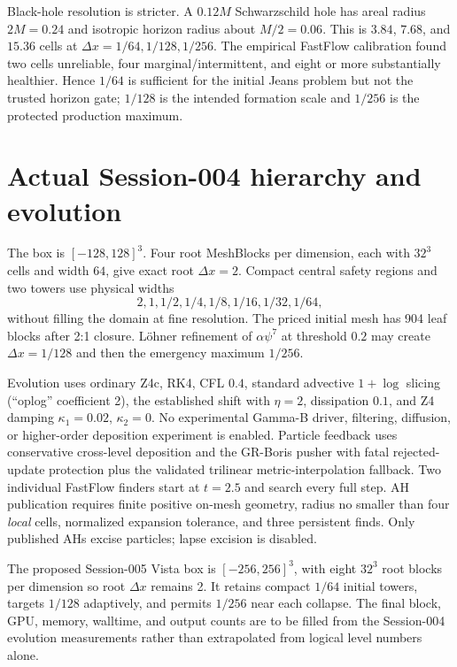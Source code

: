 \documentclass[11pt]{article}
\begin{document}
Black-hole resolution is stricter.  A $0.12M$ Schwarzschild hole has areal radius
$2M=0.24$ and isotropic horizon radius about $M/2=0.06$.  This is $3.84$, $7.68$,
and $15.36$ cells at $\Delta x=1/64,1/128,1/256$.  The empirical FastFlow calibration
found two cells unreliable, four marginal/intermittent, and eight or more substantially
healthier.  Hence $1/64$ is sufficient for the initial Jeans problem but not the trusted
horizon gate; $1/128$ is the intended formation scale and $1/256$ is the protected
production maximum.

\section{Actual Session-004 hierarchy and evolution}

The box is $[-128,128]^3$.  Four root MeshBlocks per dimension, each with $32^3$
cells and width $64$, give exact root $\Delta x=2$.  Compact central safety regions and
two towers use physical widths
\begin{equation}
 2,1,1/2,1/4,1/8,1/16,1/32,1/64,
\end{equation}
without filling the domain at fine resolution.  The priced initial mesh has 904 leaf
blocks after 2:1 closure.  L\"ohner refinement of $\alpha\psi^7$ at threshold $0.2$
may create $\Delta x=1/128$ and then the emergency maximum $1/256$.

Evolution uses ordinary Z4c, RK4, CFL $0.4$, standard advective $1+\log$ slicing
(``oplog'' coefficient 2), the established shift with $\eta=2$, dissipation $0.1$, and
Z4 damping $\kappa_1=0.02$, $\kappa_2=0$.  No experimental Gamma-B driver, filtering,
diffusion, or higher-order deposition experiment is enabled.  Particle feedback uses
conservative cross-level deposition and the GR-Boris pusher with fatal rejected-update
protection plus the validated trilinear metric-interpolation fallback.  Two individual
FastFlow finders start at $t=2.5$ and search every full step.  AH publication requires
finite positive on-mesh geometry, radius no smaller than four \emph{local} cells,
normalized expansion tolerance, and three persistent finds.  Only published AHs excise
particles; lapse excision is disabled.

The proposed Session-005 Vista box is $[-256,256]^3$, with eight $32^3$ root blocks
per dimension so root $\Delta x$ remains 2.  It retains compact $1/64$ initial towers,
targets $1/128$ adaptively, and permits $1/256$ near each collapse.  The final block,
GPU, memory, walltime, and output counts are to be filled from the Session-004 evolution
measurements rather than extrapolated from logical level numbers alone.
\end{document}
